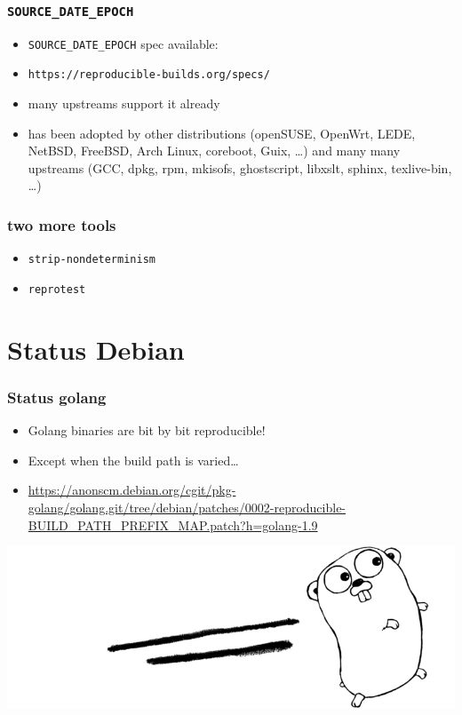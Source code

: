 \documentclass[14pt,aspectratio=169]{beamer}
\begin{document}
\begin{frame}
 \frametitle{\texttt{SOURCE\_DATE\_EPOCH}}

 \begin{itemize}
  \item \texttt{SOURCE\_DATE\_EPOCH} spec available:
  \item \texttt{https://reproducible-builds.org/specs/}
  \item many upstreams support it already
  \item has been adopted by other distributions
  (openSUSE, OpenWrt, LEDE, NetBSD, FreeBSD, Arch Linux, coreboot, Guix, …) and many many
  upstreams (GCC, dpkg, rpm, mkisofs, ghostscript, libxslt, sphinx,
  texlive-bin, …)
 \end{itemize}
\end{frame}

\begin{frame}
 \frametitle{two more tools}

 \begin{itemize}
  \item \texttt{strip-nondeterminism} 
  \item<2> \texttt{reprotest} 
 \end{itemize}
\end{frame}

\section{Status Debian}

\begin{frame}
 \frametitle{Status golang}

 \begin{itemize}
  \item<2-4> Golang binaries are bit by bit reproducible!
  \item<3-4> Except when the build path is varied…
  \item<4> \url{https://anonscm.debian.org/cgit/pkg-golang/golang.git/tree/debian/patches/0002-reproducible-BUILD\_PATH\_PREFIX\_MAP.patch?h=golang-1.9}

 \end{itemize}
 \begin{center}
  \includegraphics[height=0.2\paperheight]{images/golang.png}
 \end{center}
\end{frame}
\end{document}
